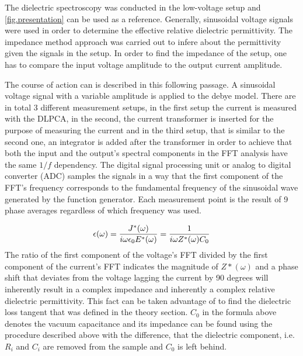 The dielectric spectroscopy was conducted in the low-voltage setup and \ref{fig.presentation} can be used as a reference.
Generally, sinusoidal voltage signals were used in order to determine the effective relative dielectric permittivity.
The impedance method \cite{Kramer} approach was carried out to infere about the permittivity given the signals in the setup.
In order to find the impedance of the setup, one has to compare the input voltage amplitude to the output current amplitude.

The course of action can is described in this following passage.
\newline
A sinusoidal voltage signal with a variable amplitude is applied to the debye model. There are in total 3 different measurement setups,
in the first setup the current is measured with the DLPCA, in the second, the current transformer is inserted for the purpose of measuring 
the current and in the third setup, that is similar to the second one, an integrator is added after the transformer in order
to achieve that both the input and the output's spectral components in the FFT analysis have the same $1/f$ dependency.
The digital signal processing unit or analog to digital converter (ADC) samples the signals in a way that 
the first component of the FFT's frequency corresponds to the fundamental frequency
of the sinusoidal wave generated by the function generator. Each measurement point is the result of 9 phase averages regardless of
which frequency was used.



\begin{equation}
\epsilon(\omega)=\frac{J^*(\omega)}{i \omega \epsilon_0 E^*(\omega)} = \frac{1}{i \omega Z^*(\omega) C_0}\\
\end{equation}
The ratio of the first component of the voltage's FFT divided by the first component of the current's FFT indicates the magnitude
of $Z*(\omega)$ and a phase shift that deviates from the voltage lagging the current by 90 degrees will inherently result in a complex impedance and
inherently a complex relative dielectric permittivity. This fact can be
taken advantage of to find the dielectric loss tangent that was defined in the theory section.
\newline
$C_0$ in the formula above denotes the vacuum capacitance and its impedance can be found using the procedure described above with the difference, that
the dielectric component, i.e. $R_i$ and $C_i$ are removed from the sample and $C_0$ is left behind.

